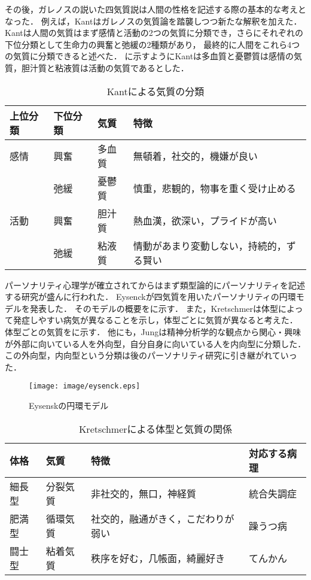 その後，ガレノスの説いた四気質説は人間の性格を記述する際の基本的な考えとなった．
例えば，Kantはガレノスの気質論を踏襲しつつ新たな解釈を加えた\cite{kant}．
Kantは人間の気質はまず感情と活動の2つの気質に分類でき，さらにそれぞれの下位分類として生命力の興奮と弛緩の2種類があり，
最終的に人間をこれら4つの気質に分類できると述べた．
に示すようにKantは多血質と憂鬱質は感情の気質，胆汁質と粘液質は活動の気質であるとした．

\begin{table}[htb]
    \centering
    \caption{Kantによる気質の分類}
    \begin{tabular}{llll} \hline
        上位分類 & 下位分類 & 気質 & 特徴 \\ \hline
        感情 & 興奮 & 多血質 & 無頓着，社交的，機嫌が良い \\
        & 弛緩 & 憂鬱質 & 慎重，悲観的，物事を重く受け止める \\ \hline 
        活動 & 興奮 & 胆汁質 & 熱血漢，欲深い，プライドが高い \\ 
        & 弛緩 & 粘液質 & 情動があまり変動しない，持続的，ずる賢い \\ \hline
    \end{tabular}
    \label{tab:kant}
\end{table}

パーソナリティ心理学が確立されてからはまず類型論的にパーソナリティを記述する研究が盛んに行われた．
Eysenck\cite{eysenck-1963}が四気質を用いたパーソナリティの円環モデルを発表した．
そのモデルの概要をに示す．
また，Kretschmer\cite{kretschmer}は体型によって発症しやすい病気が異なることを示し，体型ごとに気質が異なると考えた．
体型ごとの気質をに示す．
他にも，Jung\cite{jung}は精神分析学的な観点から関心・興味が外部に向いている人を外向型，自分自身に向いている人を内向型に分類した．
この外向型，内向型という分類は後のパーソナリティ研究に引き継がれていった．

\begin{figure}[htb]
    \centering
    \texttt{[image: image/eysenck.eps]}
    \caption{Eysenskの円環モデル}
    \label{fig:eysenck}
\end{figure}

\begin{table}[htb]
    \centering
    \caption{Kretschmerによる体型と気質の関係}
    \begin{tabular}{llll} \hline
        体格 & 気質 & 特徴 & 対応する病理 \\ \hline
        細長型 & 分裂気質 & 非社交的，無口，神経質 & 統合失調症 \\
        肥満型 & 循環気質 & 社交的，融通がきく，こだわりが弱い & 躁うつ病 \\
        闘士型 & 粘着気質 & 秩序を好む，几帳面，綺麗好き & てんかん \\ \hline
    \end{tabular}
    \label{tab:kretschmer}
\end{table}

